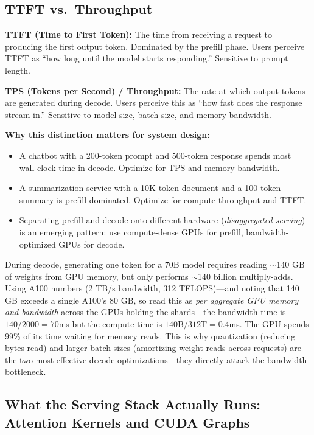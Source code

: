 \subsection{TTFT vs.\ Throughput}

\textbf{TTFT (Time to First Token):} The time from receiving a request to producing the first output token. Dominated by the prefill phase. Users perceive TTFT as ``how long until the model starts responding.'' Sensitive to prompt length.

\textbf{TPS (Tokens per Second) / Throughput:} The rate at which output tokens are generated during decode. Users perceive this as ``how fast does the response stream in.'' Sensitive to model size, batch size, and memory bandwidth.

\textbf{Why this distinction matters for system design:}
\begin{itemize}
    \item A chatbot with a 200-token prompt and 500-token response spends most wall-clock time in decode. Optimize for TPS and memory bandwidth.
    \item A summarization service with a 10K-token document and a 100-token summary is prefill-dominated. Optimize for compute throughput and TTFT.
    \item Separating prefill and decode onto different hardware (\textit{disaggregated serving}) is an emerging pattern: use compute-dense GPUs for prefill, bandwidth-optimized GPUs for decode.
\end{itemize}

\begin{keyinsight}
During decode, generating one token for a 70B model requires reading $\sim$140 GB of weights from GPU memory, but only performs $\sim$140 billion multiply-adds. Using A100 numbers (2 TB/s bandwidth, 312 TFLOPS)---and noting that 140 GB exceeds a single A100's 80 GB, so read this as \textit{per aggregate GPU memory and bandwidth} across the GPUs holding the shards---the bandwidth time is $140/2000 = 70$ms but the compute time is $140\text{B}/312\text{T} = 0.4$ms. The GPU spends 99\% of its time waiting for memory reads. This is why quantization (reducing bytes read) and larger batch sizes (amortizing weight reads across requests) are the two most effective decode optimizations---they directly attack the bandwidth bottleneck.
\end{keyinsight}

\subsection{What the Serving Stack Actually Runs: Attention Kernels and CUDA Graphs}
\label{sec:serving_kernels}

